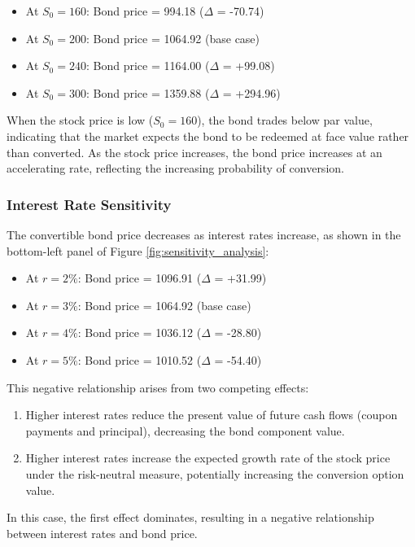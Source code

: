 \begin{itemize}
    \item At $S_0 = 160$: Bond price = 994.18 ($\Delta$ = -70.74)
    \item At $S_0 = 200$: Bond price = 1064.92 (base case)
    \item At $S_0 = 240$: Bond price = 1164.00 ($\Delta$ = +99.08)
    \item At $S_0 = 300$: Bond price = 1359.88 ($\Delta$ = +294.96)
\end{itemize}

When the stock price is low ($S_0 = 160$), the bond trades below par value, indicating that the market expects the bond to be redeemed at face value rather than converted. As the stock price increases, the bond price increases at an accelerating rate, reflecting the increasing probability of conversion.

\subsubsection{Interest Rate Sensitivity}

The convertible bond price decreases as interest rates increase, as shown in the bottom-left panel of Figure \ref{fig:sensitivity_analysis}:

\begin{itemize}
    \item At $r = 2\%$: Bond price = 1096.91 ($\Delta$ = +31.99)
    \item At $r = 3\%$: Bond price = 1064.92 (base case)
    \item At $r = 4\%$: Bond price = 1036.12 ($\Delta$ = -28.80)
    \item At $r = 5\%$: Bond price = 1010.52 ($\Delta$ = -54.40)
\end{itemize}

This negative relationship arises from two competing effects:
\begin{enumerate}
    \item Higher interest rates reduce the present value of future cash flows (coupon payments and principal), decreasing the bond component value.
    \item Higher interest rates increase the expected growth rate of the stock price under the risk-neutral measure, potentially increasing the conversion option value.
\end{enumerate}

In this case, the first effect dominates, resulting in a negative relationship between interest rates and bond price.
